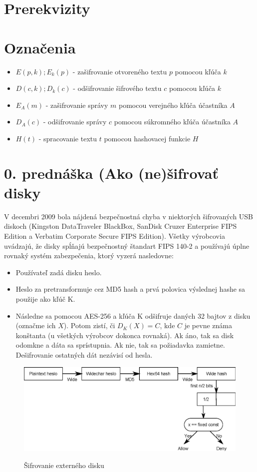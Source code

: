 \section{Prerekvizity}

\section{Označenia}

\begin{itemize}
\item $E(p,k); E_k(p)$ - zašifrovanie otvoreného textu $p$ pomocou kľúča $k$
\item $D(c,k); D_k(c)$ - odšifrovanie šifrového textu $c$ pomocou kľúča $k$
\item $E_A(m)$ - zašifrovanie správy $m$ pomocou verejného kľúča účastníka $A$
\item $D_A(c)$ - odšifrovanie správy $c$ pomocou súkromného kľúča účastníka $A$
\item $H(t)$ - spracovanie textu $t$ pomocou hashovacej funkcie $H$
\end{itemize}

\section{0. prednáška (Ako (ne)šifrovať disky}

V decembri 2009 bola nájdená bezpečnostná chyba v niektorých šifrovaných USB diskoch
(Kingston DataTraveler BlackBox, SanDisk Cruzer Enterprise FIPS Edition a
Verbatim Corporate Secure FIPS Edition). Všetky výrobcovia uvádzajú, že disky
spĺňajú bezpečnostný štandart FIPS 140-2 a používajú úplne rovnaký systém zabezpečenia,
ktorý vyzerá nasledovne:
\begin{itemize}
\item Používateľ zadá disku heslo.
\item Heslo za pretransformuje cez MD5 hash a prvá polovica výslednej hashe sa použije ako kľúč K.
\item Následne sa pomocou AES-256 a kľúča K odšifruje daných 32 bajtov z disku (označme ich $X$). Potom zistí, či
$D_K(X)=C$, kde $C$ je pevne známa konštanta (u všetkých výrobcov dokonca rovnaká). Ak áno, tak sa disk odomkne a dáta sa sprístupnia.
Ak nie, tak sa požiadavka zamietne. Dešifrovanie ostatných dát nezávisí od hesla.
\end{itemize}

\begin{figure}[htp]
    \centering
    \includegraphics[scale=0.75]{img/0/extern_drive_encryption}
    \label{fig:extern_drive_encryption}
    \caption{Šifrovanie externého disku}
\end{figure}


